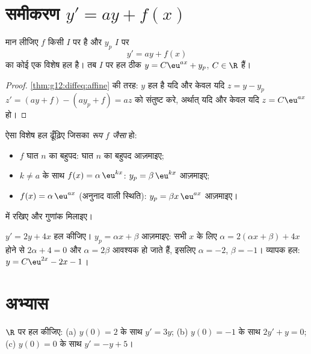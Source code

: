 \section{समीकरण \texorpdfstring{$y' = ay + f(x)$}{y' = ay + f(x)}}

\begin{proposition}[हल-समुच्चय की संरचना]\label{prop:g12:diffeq:general}
मान लीजिए $f$ किसी  $I$ पर  है और $y_p$ $I$ पर
\[
y' = ay + f(x)
\]
का कोई एक विशेष हल है। तब $I$ पर हल ठीक  $y = C\eu^{ax} + y_p$, $C \in \R$ हैं।
\end{proposition}

\begin{proof}
\cref{thm:g12:diffeq:affine} की तरह: $y$ हल है यदि और केवल यदि $z = y - y_p$ $z' = (ay + f) - (ay_p + f) = az$ को संतुष्ट करे, अर्थात्
यदि और केवल यदि $z = C\eu^{ax}$ हो।
\end{proof}

\begin{method}[विशेष हल का अनुमान लगाना]\label{met:g12:diffeq:particular}
ऐसा विशेष हल ढूँढ़िए जिसका \emph{रूप $f$ जैसा} हो:
\begin{itemize}
  \item $f$ घात $n$ का बहुपद: घात $n$ का बहुपद आज़माइए;
  \item $k \neq a$ के साथ $f(x) = \alpha\,\eu^{kx}$: $y_p = \beta\,\eu^{kx}$ आज़माइए;
  \item $f(x) = \alpha\,\eu^{ax}$ (अनुनाद वाली स्थिति): $y_p = \beta x\,\eu^{ax}$ आज़माइए।
\end{itemize}
 में रखिए और गुणांक मिलाइए।
\end{method}

\begin{example}\label{ex:g12:diffeq:particular}
$y' = 2y + 4x$ हल कीजिए। $y_p = \alpha x + \beta$ आज़माइए: सभी $x$ के लिए $\alpha = 2(\alpha x + \beta) + 4x$ होने से $2\alpha + 4 = 0$ और $\alpha = 2\beta$
आवश्यक हो जाते हैं, इसलिए $\alpha = -2$, $\beta = -1$। व्यापक हल: $y = C\eu^{2x} - 2x - 1$।
\end{example}

\section{अभ्यास}

\begin{exercise}[$\star$]\label{exo:g12:diffeq:1}
$\R$ पर हल कीजिए:
(a) $y(0) = 2$ के साथ $y' = 3y$;\quad
(b) $y(0) = -1$ के साथ $2y' + y = 0$;\quad
(c) $y(0) = 0$ के साथ $y' = -y + 5$।
\end{exercise}

